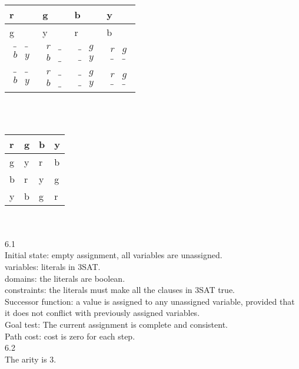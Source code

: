 \documentclass[a4paper]{article}
\begin{document}
\begin{tabular}{|l|l|l|l|}
\hline
r & g & b & y \\ \hline
g & y & r & b \\ \hline
$\begin{matrix}   \_ & \_ \\   b & y  \end{matrix}$ & $\begin{matrix}   r & \_ \\   b & \_  \end{matrix}$ & $\begin{matrix}   \_ & g \\   \_ & y  \end{matrix}$ & $\begin{matrix}   r & g \\   \_ & \_  \end{matrix}$ \\ \hline
$\begin{matrix}   \_ & \_ \\   b & y  \end{matrix}$ & $\begin{matrix}   r & \_ \\   b & \_  \end{matrix}$ & $\begin{matrix}   \_ & g \\   \_ & y  \end{matrix}$ & $\begin{matrix}   r & g \\   \_ & \_  \end{matrix}$ \\ \hline
\end{tabular}\\\\
\begin{tabular}{|l|l|l|l|}
\hline
r & g & b & y \\ \hline
g & y & r & b \\ \hline
b & r & y & g \\ \hline
y & b & g & r \\ \hline
\end{tabular}\\\\

6.1\\
Initial state: empty assignment, all variables are unassigned.\\
variables: literals in 3SAT.\\
domains: the literals are boolean.\\
constraints: the literals must make all the clauses in 3SAT true.\\
Successor function: a value is assigned to any unassigned variable, provided that it does not conflict with previously assigned variables.\\
Goal test:  The current assignment is complete and consistent.\\
Path cost: cost is zero for each step.\\

6.2\\
The arity is 3.\\
\end{document}
